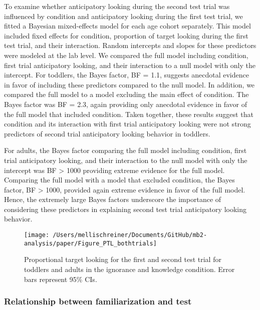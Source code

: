 \documentclass[
  man,floatsintext]{apa6}
\begin{document}
To examine whether anticipatory looking during the second test trial was influenced by condition and anticipatory looking during the first test trial, we fitted a Bayesian mixed-effects model for each age cohort separately. This model included fixed effects for condition, proportion of target looking during the first test trial, and their interaction. Random intercepts and slopes for these predictors were modeled at the lab level. We compared the full model including condition, first trial anticipatory looking, and their interaction to a null model with only the intercept. For toddlers, the Bayes factor, BF = 1.1, suggests anecdotal evidence in favor of including these predictors compared to the null model. In addition, we compared the full model to a model excluding the main effect of condition. The Bayes factor was BF = 2.3, again providing only anecdotal evidence in favor of the full model that included condition. Taken together, these results suggest that condition and its interaction with first trial anticipatory looking were not strong predictors of second trial anticipatory looking behavior in toddlers.

For adults, the Bayes factor comparing the full model including condition, first trial anticipatory looking, and their interaction to the null model with only the intercept was BF \textgreater{} 1000 providing extreme evidence for the full model. Comparing the full model with a model that excluded condition, the Bayes factor, BF \textgreater{} 1000, provided again extreme evidence in favor of the full model. Hence, the extremely large Bayes factors underscore the importance of considering these predictors in explaining second test trial anticipatory looking behavior.

\begin{figure}

{\centering \texttt{[image: /Users/mellischreiner/Documents/GitHub/mb2-analysis/paper/Figure\_PTL\_bothtrials]} 

}

\caption{Proportional target looking for the first and second test trial for toddlers and adults in the ignorance and knowledge condition. Error bars represent 95\% CIs.}\label{fig:fig6}
\end{figure}

\subsubsection{Relationship between familiarization and test}\label{relationship-between-familiarization-and-test}
\end{document}
